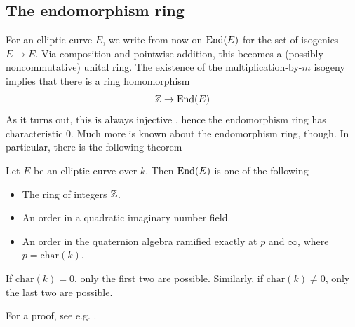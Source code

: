 \subsection{The endomorphism ring}
For an elliptic curve $E$, we write from now on $\mathrm{End}(E)$ for the set of isogenies $E \to E$.
Via composition and pointwise addition, this becomes a (possibly noncommutative) unital ring.
The existence of the multiplication-by-$m$ isogeny implies that there is a ring homomorphism
\begin{equation*}
    \mathbb{Z} \to \mathrm{End}(E)
\end{equation*}
As it turns out, this is always injective \cite[Prop.~III.4.2]{arithmetic_elliptic_curves}, hence the endomorphism ring has characteristic 0.
Much more is known about the endomorphism ring, though.
In particular, there is the following theorem
\begin{theorem}
    Let $E$ be an elliptic curve over $k$. Then $\mathrm{End}(E)$ is one of the following
    \begin{itemize}
        \item The ring of integers $\mathbb{Z}$.
        \item An order in a quadratic imaginary number field.
        \item An order in the quaternion algebra ramified exactly at $p$ and $\infty$, where $p = \mathrm{char}(k)$.
    \end{itemize}
    If $\mathrm{char}(k) = 0$, only the first two are possible.
    Similarly, if $\mathrm{char}(k) \neq 0$, only the last two are possible. 
\end{theorem}
For a proof, see e.g. \cite[Corollary~III.9.4]{arithmetic_elliptic_curves}.

